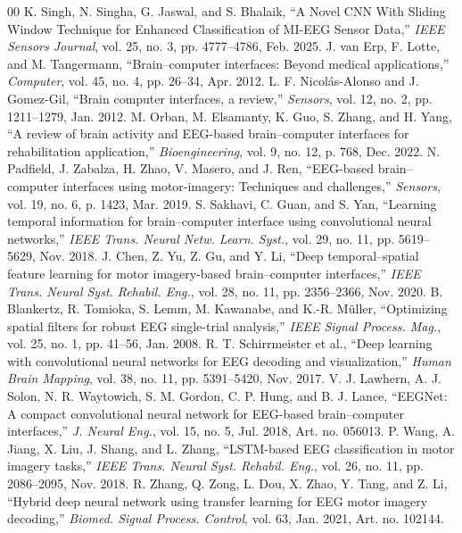 \documentclass[conference]{IEEEtran}
\begin{document}
\begin{thebibliography}{00}
 K. Singh, N. Singha, G. Jaswal, and S. Bhalaik, ``A Novel CNN With Sliding Window Technique for Enhanced Classification of MI-EEG Sensor Data,'' \textit{IEEE Sensors Journal}, vol. 25, no. 3, pp. 4777--4786, Feb. 2025.
 J. van Erp, F. Lotte, and M. Tangermann, ``Brain--computer interfaces: Beyond medical applications,'' \textit{Computer}, vol. 45, no. 4, pp. 26--34, Apr. 2012.
 L. F. Nicol\'{a}s-Alonso and J. Gomez-Gil, ``Brain computer interfaces, a review,'' \textit{Sensors}, vol. 12, no. 2, pp. 1211--1279, Jan. 2012.
 M. Orban, M. Elsamanty, K. Guo, S. Zhang, and H. Yang, ``A review of brain activity and EEG-based brain--computer interfaces for rehabilitation application,'' \textit{Bioengineering}, vol. 9, no. 12, p. 768, Dec. 2022.
 N. Padfield, J. Zabalza, H. Zhao, V. Masero, and J. Ren, ``EEG-based brain--computer interfaces using motor-imagery: Techniques and challenges,'' \textit{Sensors}, vol. 19, no. 6, p. 1423, Mar. 2019.
 S. Sakhavi, C. Guan, and S. Yan, ``Learning temporal information for brain--computer interface using convolutional neural networks,'' \textit{IEEE Trans. Neural Netw. Learn. Syst.}, vol. 29, no. 11, pp. 5619--5629, Nov. 2018.
 J. Chen, Z. Yu, Z. Gu, and Y. Li, ``Deep temporal--spatial feature learning for motor imagery-based brain--computer interfaces,'' \textit{IEEE Trans. Neural Syst. Rehabil. Eng.}, vol. 28, no. 11, pp. 2356--2366, Nov. 2020.
 B. Blankertz, R. Tomioka, S. Lemm, M. Kawanabe, and K.-R. M\"{u}ller, ``Optimizing spatial filters for robust EEG single-trial analysis,'' \textit{IEEE Signal Process. Mag.}, vol. 25, no. 1, pp. 41--56, Jan. 2008.
 R. T. Schirrmeister et al., ``Deep learning with convolutional neural networks for EEG decoding and visualization,'' \textit{Human Brain Mapping}, vol. 38, no. 11, pp. 5391--5420, Nov. 2017.
 V. J. Lawhern, A. J. Solon, N. R. Waytowich, S. M. Gordon, C. P. Hung, and B. J. Lance, ``EEGNet: A compact convolutional neural network for EEG-based brain--computer interfaces,'' \textit{J. Neural Eng.}, vol. 15, no. 5, Jul. 2018, Art. no. 056013.
 P. Wang, A. Jiang, X. Liu, J. Shang, and L. Zhang, ``LSTM-based EEG classification in motor imagery tasks,'' \textit{IEEE Trans. Neural Syst. Rehabil. Eng.}, vol. 26, no. 11, pp. 2086--2095, Nov. 2018.
 R. Zhang, Q. Zong, L. Dou, X. Zhao, Y. Tang, and Z. Li, ``Hybrid deep neural network using transfer learning for EEG motor imagery decoding,'' \textit{Biomed. Signal Process. Control}, vol. 63, Jan. 2021, Art. no. 102144.

\end{thebibliography}
\end{document}
